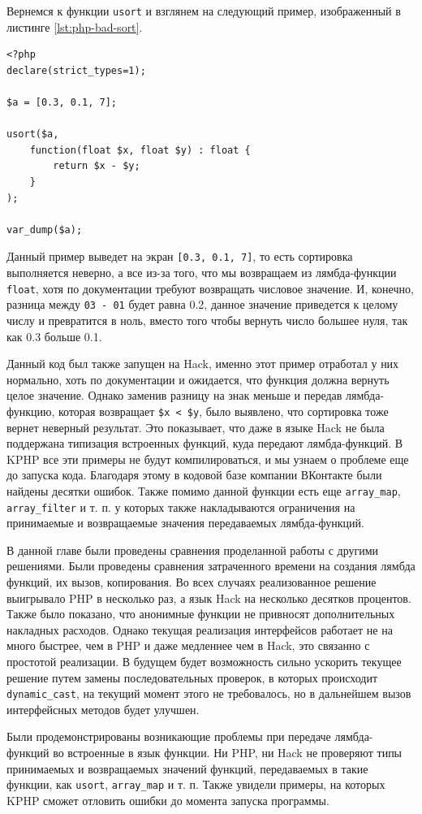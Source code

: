 Вернемся к функции \verb|usort| и взглянем на следующий пример, изображенный в листинге \ref{lst:php-bad-sort}.
\begin{lstlisting}[caption={Пример типизации в PHP7}, label={lst:php-bad-sort}]
<?php
declare(strict_types=1);

$a = [0.3, 0.1, 7];

usort($a,
    function(float $x, float $y) : float {
        return $x - $y;
    }
);

var_dump($a);
\end{lstlisting}

Данный пример выведет на экран \verb|[0.3, 0.1, 7]|, то есть сортировка выполняется неверно, а все из-за того, что мы возвращаем из лямбда-функции \verb|float|, хотя по документации требуют возвращать числовое значение.
И, конечно, разница между \verb|03 - 01| будет равна 0.2, данное значение приведется к целому числу и превратится в ноль, вместо того чтобы вернуть число большее нуля, так как 0.3 больше 0.1.

Данный код был также запущен на Hack, именно этот пример отработал у них нормально, хоть по документации и ожидается, что функция должна вернуть целое значение.
Однако заменив разницу на знак меньше и передав лямбда-функцию, которая возвращает \verb|$x < $y|, было выявлено, что сортировка тоже вернет неверный результат.
Это показывает, что даже в языке Hack не была поддержана типизация встроенных функций, куда передают лямбда-функций.
В KPHP все эти примеры не будут компилироваться, и мы узнаем о проблеме еще до запуска кода.
Благодаря этому в кодовой базе компании ВКонтакте были найдены десятки ошибок.
Также помимо данной функции есть еще \verb|array_map|, \verb|array_filter| и т. п. у которых также накладываются ограничения на принимаемые и возвращаемые значения передаваемых лямбда-функций.

\chapterconclusion
В данной главе были проведены сравнения проделанной работы с другими решениями.
Были проведены сравнения затраченного времени на создания лямбда функций, их вызов, копирования.
Во всех случаях реализованное решение выигрывало PHP в несколько раз, а язык Hack на несколько десятков процентов.
Также было показано, что анонимные функции не привносят дополнительных накладных расходов.
Однако текущая реализация интерфейсов работает не на много быстрее, чем в PHP и даже медленнее чем в Hack, это связанно с простотой реализации.
В будущем будет возможность сильно ускорить текущее решение путем замены последовательных проверок, в которых происходит \verb|dynamic_cast|, на текущий момент этого не требовалось, но в дальнейшем вызов интерфейсных методов будет улучшен.

Были продемонстрированы возникающие проблемы при передаче лямбда-функций во встроенные в язык функции.
Ни PHP, ни Hack не проверяют типы принимаемых и возвращаемых значений функций, передаваемых в такие функции, как \verb|usort|, \verb|array_map| и т. п.
Также увидели примеры, на которых KPHP сможет отловить ошибки до момента запуска программы.
